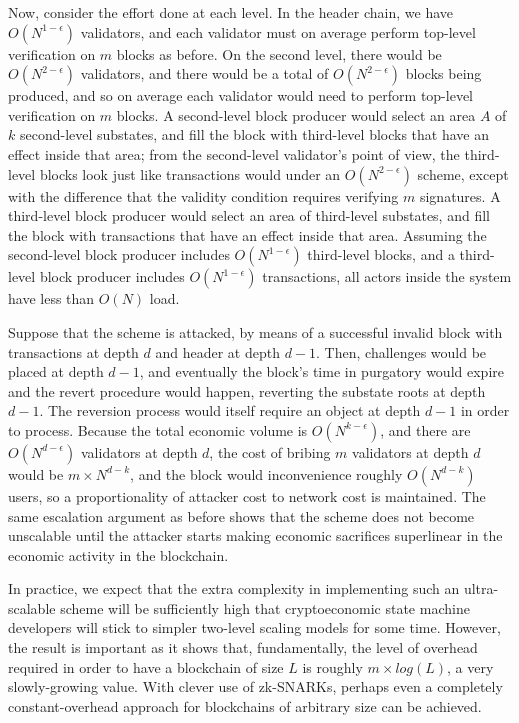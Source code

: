 \documentclass[11pt,a4paper]{report}
\theoremstyle{plain}
\theoremstyle{definition}
\theoremstyle{remark}
\begin{document}
Now, consider the effort done at each level. In the header chain, we have $O(N^{1-\epsilon})$ validators, and each validator must on average perform top-level verification on $m$ blocks as before. On the second level, there would be $O(N^{2-\epsilon})$ validators, and there would be a total of $O(N^{2-\epsilon})$ blocks being produced, and so on average each validator would need to perform top-level verification on $m$ blocks. A second-level block producer would select an area $A$ of $k$ second-level substates, and fill the block with third-level blocks that have an effect inside that area; from the second-level validator's point of view, the third-level blocks look just like transactions would under an $O(N^{2-\epsilon})$ scheme, except with the difference that the validity condition requires verifying $m$ signatures. A third-level block producer would select an area of third-level substates, and fill the block with transactions that have an effect inside that area. Assuming the second-level block producer includes $O(N^{1-\epsilon})$ third-level blocks, and a third-level block producer includes $O(N^{1-\epsilon})$ transactions, all actors inside the system have less than $O(N)$ load.

Suppose that the scheme is attacked, by means of a successful invalid block with transactions at depth $d$ and header at depth $d - 1$. Then, challenges would be placed at depth $d - 1$, and eventually the block's time in purgatory would expire and the revert procedure would happen, reverting the substate roots at depth $d - 1$. The reversion process would itself require an object at depth $d - 1$ in order to process. Because the total economic volume is $O(N^{k-\epsilon})$, and there are $O(N^{d-\epsilon})$ validators at depth $d$, the cost of bribing $m$ validators at depth $d$ would be $m \times  N^{d - k}$, and the block would inconvenience roughly $O(N^{d - k})$ users, so a proportionality of attacker cost to network cost is maintained. The same escalation argument as before shows that the scheme does not become unscalable until the attacker starts making economic sacrifices superlinear in the economic activity in the blockchain.

In practice, we expect that the extra complexity in implementing such an ultra-scalable scheme will be sufficiently high that cryptoeconomic state machine developers will stick to simpler two-level scaling models for some time. However, the result is important as it shows that, fundamentally, the level of overhead required in order to have a blockchain of size $L$ is roughly $m \times  log(L)$, a very slowly-growing value. With clever use of zk-SNARKs, perhaps even a completely constant-overhead approach for blockchains of arbitrary size can be achieved.
\end{document}
